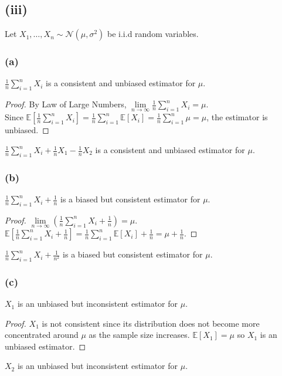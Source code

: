 \documentclass[twoside,11pt]{homework}
\begin{document}
\subsection*{(iii)}
	Let $X_1,\dots, X_n \sim \mathcal{N}(\mu, \sigma^2)$ be i.i.d random variables.
\subsubsection*{(a)}
	\begin{claim}
		$\frac{1}{n} \sum_{i=1}^n X_i $ is a consistent and unbiased estimator for $\mu$.
	\end{claim}
	\begin{proof}
		By Law of Large Numbers, 
		$ \lim\limits_{n\rightarrow \infty} \frac{1}{n} \sum_{i=1}^n X_i = \mu$.\\
		Since $\mathbb{E}[\frac{1}{n} \sum_{i=1}^n X_i]
		=\frac{1}{n} \sum_{i=1}^n \mathbb{E}[X_i]
		=\frac{1}{n} \sum_{i=1}^n \mu
		=\mu
		$, the estimator is unbiased.
	\end{proof}
	\begin{claim}
		$\frac{1}{n} \sum_{i=1}^n X_i + \frac{1}{n} X_1- \frac{1}{n} X_2$ is a consistent and unbiased estimator for $\mu$.
	\end{claim}
\subsubsection*{(b)}	
	\begin{claim}
		$ \frac{1}{n} \sum_{i=1}^n X_i +\frac{1}{n}$ is a biased but consistent estimator for $\mu$.
	\end{claim}
	\begin{proof}
		$ \lim\limits_{n\rightarrow \infty} (\frac{1}{n} \sum_{i=1}^n X_i +\frac{1}{n})= \mu$.
		$\mathbb{E}[\frac{1}{n} \sum_{i=1}^n X_i +\frac{1}{n}]
		=\frac{1}{n} \sum_{i=1}^n \mathbb{E}[X_i] +\frac{1}{n}
		=\mu+\frac{1}{n}.
		$
	\end{proof}
	\begin{claim}
		$ \frac{1}{n} \sum_{i=1}^n X_i +\frac{1}{n^2}$ is a biased but consistent estimator for $\mu$.
	\end{claim}
\subsubsection*{(c)}
	\begin{claim}
		$X_1$ is an unbiased but inconsistent estimator for $\mu$.
	\end{claim}
	\begin{proof}
		$X_1$ is not consistent since its distribution does not become more concentrated around $\mu$ 
		as the sample size increases.
		$\mathbb{E}[X_1] =\mu$ so $X_1$ is an unbiased estimator.
	\end{proof}
	\begin{claim}
		$X_2$ is an unbiased but inconsistent estimator for $\mu$.
	\end{claim}
\end{document}
